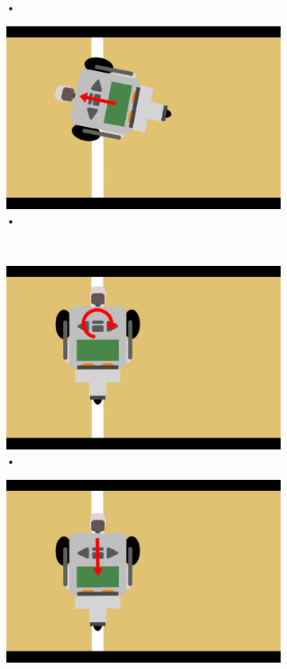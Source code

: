 \documentclass[tt3]{penoverslag}
\begin{document}
\begin{description}
\begin{figure}
\begin{subfigure}[h]{0.24\textwidth}
		\caption{•}
		\label{fig:AlgoWit3}
	\end{subfigure}
	\begin{subfigure}[h]{0.24\textwidth}
		\includegraphics[width=\textwidth]{WitteLijn4}
		\caption{•}
		\label{fig:AlgoWit4}
	\end{subfigure}\\ \vspace{0.2cm}
	\begin{subfigure}[h]{0.24\textwidth}
		\includegraphics[width=\textwidth]{WitteLijn5}
		\caption{•}
		\label{fig:AlgoWit5}
	\end{subfigure}
	\begin{subfigure}[h]{0.24\textwidth}
		\includegraphics[width=\textwidth]{WitteLijn6}

\end{subfigure}
\end{figure}
\end{description}
\end{document}
